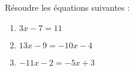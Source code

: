 \documentclass[a4paper,11pt,exos]{nsi} %
\begin{document}
\maketitle




\begin{exercice}
Résoudre les équations suivantes :
\begin{multicols}{3}
	\begin{enumerate}
		\item $3x-7=11$
	    \item $13x-9=-10x-4$
	    \item $-11x-2=-5x+3$
	\end{enumerate}
\end{multicols}

\end{exercice}
\end{document}
